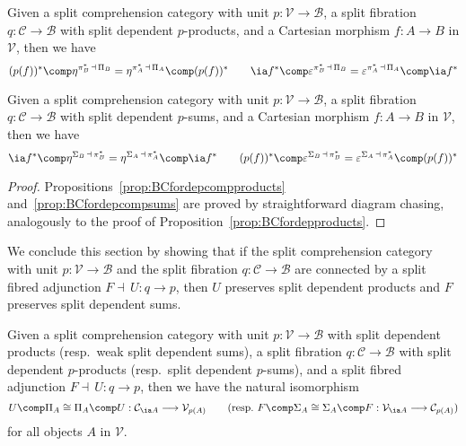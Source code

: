 \begin{proposition}
\label{prop:BCfordepcompproducts}
Given a split comprehension category with unit $p : \mathcal{V} \longrightarrow \mathcal{B}$, a split fibration $q : \mathcal{C} \longrightarrow \mathcal{B}$ with split dependent $p$-products, and a Cartesian morphism $f : A \longrightarrow B$ in $\mathcal{V}$, then we have 
\[
(p(f))^* \comp \eta^{\pi^*_B \,\dashv\, \Pi_B} = \eta^{\pi^*_A \,\dashv\, \Pi_A} \comp (p(f))^*
\qquad
\ia f ^* \comp \varepsilon^{\pi^*_B \,\dashv\, \Pi_B} = \varepsilon^{\pi^*_A \,\dashv\, \Pi_A} \comp \ia f ^*
\]
\end{proposition}

\begin{proposition}
\label{prop:BCfordepcompsums}
Given a split comprehension category with unit $p : \mathcal{V} \longrightarrow \mathcal{B}$, a split fibration $q : \mathcal{C} \longrightarrow \mathcal{B}$ with split dependent $p$-sums, and a Cartesian morphism $f : A \longrightarrow B$ in $\mathcal{V}$, then we have 
\[
\ia f ^* \comp \eta^{\Sigma_B \,\dashv\, \pi^*_B} = \eta^{\Sigma_A \,\dashv\, \pi^*_A} \comp \ia f ^*
\qquad
(p(f))^* \comp \varepsilon^{\Sigma_B \,\dashv\, \pi^*_B} = \varepsilon^{\Sigma_A \,\dashv\, \pi^*_A} \comp (p(f))^*
\]
\end{proposition}

\begin{proof}
Propositions~\ref{prop:BCfordepcompproducts} and~\ref{prop:BCfordepcompsums} are proved by straightforward diagram chasing, analogously to the proof of Proposition~\ref{prop:BCfordepproducts}.
\end{proof}

We conclude this section by showing that if the split comprehension category with unit $p : \mathcal{V} \longrightarrow \mathcal{B}$ and the split fibration $q : \mathcal{C} \longrightarrow \mathcal{B}$ are connected by a split fibred adjunction $F \dashv\, U : q \longrightarrow p$, then $U$ preserves split dependent products and $F$ preserves split dependent sums.

\begin{proposition}
\label{prop:UandFpreserveSigmaPi}
Given a split comprehension category with unit $p : \mathcal{V} \longrightarrow \mathcal{B}$ \linebreak with split dependent products (resp.~weak split dependent sums), a split fibration \linebreak $q : \mathcal{C} \longrightarrow \mathcal{B}$ with split dependent $p$-products (resp.~split dependent $p$-sums), and a split fibred adjunction $F \dashv\, U : q \longrightarrow p$, then we have the natural isomorphism
\[
U \comp \Pi_A \cong \Pi_A \comp U : \mathcal{C}_{\ia A} \longrightarrow \mathcal{V}_{p(A)}
\qquad
(\text{resp.~} F \comp \Sigma_A \cong \Sigma_A \comp F : \mathcal{V}_{\ia A} \longrightarrow \mathcal{C}_{p(A)})
\]
for all objects $A$ in $\mathcal{V}$.
\end{proposition}

